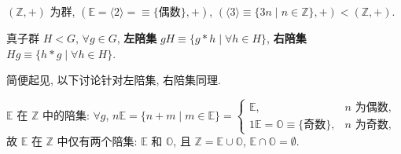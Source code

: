 \documentclass{note}
\begin{document}
\begin{eg}
    $(\mathbb{Z},+)$ 为群, $(\mathbb{E}=\langle 2\rangle=\equiv\{偶数\},+)$, $(\langle 3\rangle\equiv\{3n\mid n\in\mathbb{Z}\},+)<(\mathbb{Z},+)$.
\end{eg}

\begin{df}[陪集 (Coset)]
    真子群 $H<G$, $\forall g\in G$, \textbf{左陪集} $gH\equiv\{g*h\mid\forall h\in H\}$, \textbf{右陪集} $Hg\equiv\{h*g\mid\forall h\in H\}$.
\end{df}

简便起见, 以下讨论针对左陪集, 右陪集同理.

\begin{eg}
    $\mathbb{E}$ 在 $\mathbb{Z}$ 中的陪集: $\forall g$, $n\mathbb{E}=\{n+m\mid m\in\mathbb{E}\}=\left\{\begin{array}{ll}
        \mathbb{E},&n\text{ 为偶数},\\
        1\mathbb{E}=\mathbb{O}\equiv\{\text{奇数}\},&n\text{ 为奇数},
    \end{array}\right.$ 故 $\mathbb{E}$ 在 $\mathbb{Z}$ 中仅有两个陪集: $\mathbb{E}$ 和 $\mathbb{O}$, 且 $\mathbb{Z}=\mathbb{E}\cup\mathbb{O}$, $\mathbb{E}\cap\mathbb{O}=\emptyset$.
\end{eg}
\end{document}
